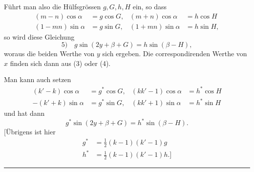 Führt man also die Hülfsgrössen \(g,G,h,H\) ein, so dass
\[
\begin{aligned}
(m-n)\cos\alpha&=g\cos G, &(m+n)\cos\alpha&=h\cos H\\
(1-mn)\sin\alpha&=g\sin G, &(1+mn)\sin\alpha&=h\sin H,
\end{aligned}
\]
so wird diese Gleichung
\[
5)\quad g\sin(2y+\beta+G)=h\sin(\beta-H),
\]
woraus die beiden Werthe von \(y\) sich ergeben. Die correspondirenden Werthe von \(x\) finden sich dann aus (3) oder (4).

Man kann auch setzen
\[
\begin{aligned}
(k'-k)\cos\alpha&=g^*\cos G, &(kk'-1)\cos\alpha&=h^*\cos H\\
-(k'+k)\sin\alpha&=g^*\sin G, &(kk'+1)\sin\alpha&=h^*\sin H
\end{aligned}
\]
und hat dann
\[
g^*\sin(2y+\beta+G)=h^*\sin(\beta-H).
\]
[Übrigens ist hier
\[
\begin{aligned}
g^*&=\tfrac12(k-1)(k'-1)g\\
h^*&=\tfrac12(k-1)(k'-1)h.]
\end{aligned}
\]
\begin{center}\rule{.18\textwidth}{.35pt}\end{center}
